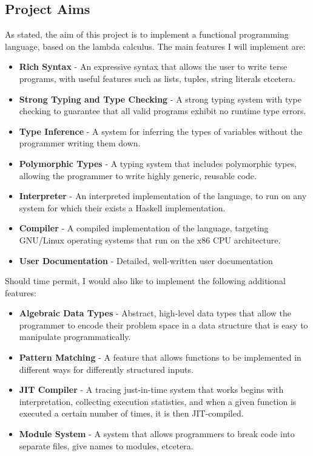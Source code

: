 \documentclass{article}
\begin{document}
\subsection{Project Aims} %
As stated, the aim of this project is to implement a functional programming language, based on the lambda calculus. The main features I will implement are:
\begin{itemize}
    \item \textbf{Rich Syntax} - An expressive syntax that allows the user to write terse programs, with useful features such as lists, tuples, string literals etcetera.
    \item \textbf{Strong Typing and Type Checking} - A strong typing system with type checking to guarantee that all valid programs exhibit no runtime type errors.
    \item \textbf{Type Inference} - A system for inferring the types of variables without the programmer writing them down.
    \item \textbf{Polymorphic Types} - A typing system that includes polymorphic types, allowing the programmer to write highly generic, reusable code.
    \item \textbf{Interpreter} - An interpreted implementation of the language, to run on any system for which their exists a Haskell implementation.
    \item \textbf{Compiler} - A compiled implementation of the language, targeting GNU/Linux operating systems that run on the x86 CPU architecture.
    \item \textbf{User Documentation} - Detailed, well-written user documentation
\end{itemize}
Should time permit, I would also like to implement the following additional features:
\begin{itemize}
    \item \textbf{Algebraic Data Types} - Abstract, high-level data types that allow the programmer to encode their problem space in a data structure that is easy to manipulate programmatically.
    \item \textbf{Pattern Matching} - A feature that allows functions to be implemented in different ways for differently structured inputs.
    \item \textbf{JIT Compiler} - A tracing just-in-time system that works begins with interpretation, collecting execution statistics, and when a given function is executed a certain number of times, it is then JIT-compiled.
    \item \textbf{Module System} - A system that allows programmers to break code into separate files, give names to modules, etcetera.
\end{itemize}
\end{document}
